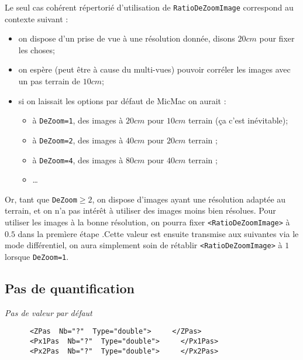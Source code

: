 Le seul cas coh\'erent r\'epertori\'e d'utilisation de  {\tt RatioDeZoomImage}
correspond au contexte suivant :

\begin{itemize}
   \item  on dispose d'un prise de vue \`a une r\'esolution donn\'ee,
          disons $20 cm$ pour fixer les choses;

    \item on esp\`ere (peut \^etre \`a cause du multi-vues) pouvoir 
          corr\'eler les images avec un pas terrain de $10 cm$;

     \item si on laissait les options par d\'efaut de MicMac on
           aurait  :
     \begin{itemize} 
           \item  \`a {\tt DeZoom=1}, des images \`a $20 cm$ 
              pour $10 cm$ terrain (\c{c}a c'est in\'evitable);

           \item  \`a {\tt DeZoom=2}, des images \`a $40 cm$ 
              pour $20 cm$ terrain ;

           \item  \`a {\tt DeZoom=4}, des images \`a $80 cm$ 
              pour $40 cm$ terrain ;
           \item  \dots 
     \end{itemize}

\end{itemize}
 
Or, tant que  {\tt DeZoom$\geq2$}, on dispose d'images ayant une r\'esolution
adapt\'ee au terrain, et on n'a pas int\'er\^et \`a utiliser des images
moins bien r\'esolues.  Pour utiliser les images \`a la bonne
r\'esolution, on pourra fixer {\tt <RatioDeZoomImage>} \`a $0.5$
dans la prem\`iere \'etape .Cette valeur est ensuite transmise
aux suivantes via le mode diff\'erentiel, on aura simplement soin
de r\'etablir {\tt <RatioDeZoomImage>}  \`a $1$  lorsque {\tt DeZoom=1}.



\subsection{Pas de quantification}

\label{Pas:Quantif}

\emph{Pas de valeur par d\'efaut}
\begin{verbatim}
      <ZPas  Nb="?"  Type="double">     </ZPas>
      <Px1Pas  Nb="?"  Type="double">     </Px1Pas>
      <Px2Pas  Nb="?"  Type="double">     </Px2Pas>
\end{verbatim}

